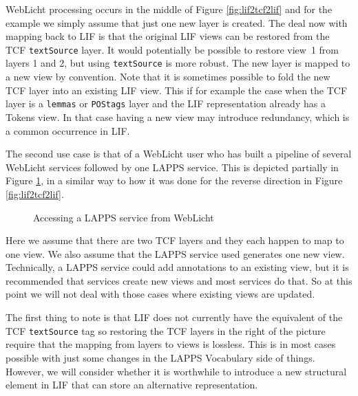\documentclass[11pt]{article}
\newcommand{\tag}[1]{{\tt #1}}
\begin{document}
WebLicht processing occurs in the middle of Figure \ref{fig:lif2tcf2lif} and for the example we simply assume that just one new layer is created. The deal now with mapping back to LIF is that the original LIF views can be restored from the TCF \tag{textSource} layer. It would potentially be possible to restore view~1 from layers 1 and 2, but using \tag{textSource} is more robust. The new layer is mapped to a new view by convention. Note that it is sometimes possible to fold the new TCF layer into an existing LIF view. This if for example the case when the TCF layer is a \tag{lemmas} or \tag{POStags} layer and the LIF representation already has a Tokens view. In that case having a new view may introduce redundancy, which is a common occurrence in LIF.

The second use case is that of a WebLicht user who has built a pipeline of several WebLicht services followed by one LAPPS service. This is depicted partially in Figure \ref{fig:tcf2lif2tcf}, in a similar way to how it was done for the reverse direction in Figure \ref{fig:lif2tcf2lif}.

\begin{figure}[ht]
  \begin{center}
    \caption{Accessing a LAPPS service from WebLicht}
    \label{fig:tcf2lif2tcf}
  \end{center}
\end{figure}

Here we assume that there are two TCF layers and they each happen to map to one view. We also assume that the LAPPS service used generates one new view. Technically, a LAPPS service could add annotations to an existing view, but it is recommended that services create new views and most services do that. So at this point we will not deal with those cases where existing views are updated.

The first thing to note is that LIF does not currently have the equivalent of the TCF \tag{textSource} tag so restoring the TCF layers in the right of the picture require that the mapping from layers to views is lossless. This is in most cases possible with just some changes in the LAPPS Vocabulary side of things. However, we will consider whether it is worthwhile to introduce a new structural element in LIF that can store an alternative representation.
\end{document}
